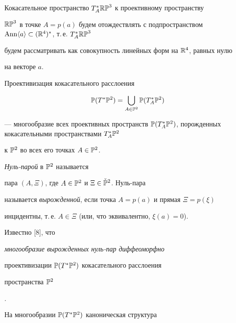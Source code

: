 Кокасательное пространство $T^{\ast}_A\Bbb{RP}^3$ к проективному пространству 


$\Bbb{RP}^3$ в точке $A=p(a)$ будем отождествлять с подпространством $\Ann 


\langle a\rangle\subset(\Bbb{R}^4)^{\ast}$, т.\,е. $T^{\ast}_A\Bbb{RP}^3$ 


будем рассматривать как совокупность линейных форм на $\Bbb{R}^4$, равных нулю 


на векторе $a$.





Проективизация кокасательного расслоения  


$$


\Bbb{P}(T^{\ast}\Bbb{P}^2)=\bigcup\limits_{A\in\Bbb{P}^2}\Bbb{P}(T^{\ast}_A


\Bbb{P}^2)


$$


--- многообразие всех проективных пространств $\Bbb{P}(T^{\ast}_A


\Bbb{P}^2)$, порожденных кокасательными пространствами $T^{\ast}_A\Bbb{P}^2$ 


к $\Bbb{P}^2$ во всех его точках $A\in\Bbb{P}^2$.








\begin{defn}


{\it Нуль-парой} в $\Bbb{P}^2$ называется  


пара $(A,\Xi)$, где $A\in\Bbb{P}^2$ и $\Xi\in\check{\Bbb{P}}^2$. Нуль-пара 


называется {\it вырожденной}, если точка $A=p(a)$ и прямая $\Xi=p(\xi)$ 


инцидентны, т.\,е. $A\in\Xi$ (или, что эквивалентно, $\xi(a)=0$).


\end{defn}





Известно [8], что {\it многообразие вырожденных нуль-пар диффеоморфно 


проективизации $\Bbb{P}(T^{\ast}\Bbb{P}^2)$ кокасательного расслоения 


пространства $\Bbb{P}^2$}.





На многообразии $\Bbb{P}(T^{\ast}\Bbb{P}^2)$ каноническая структура 


